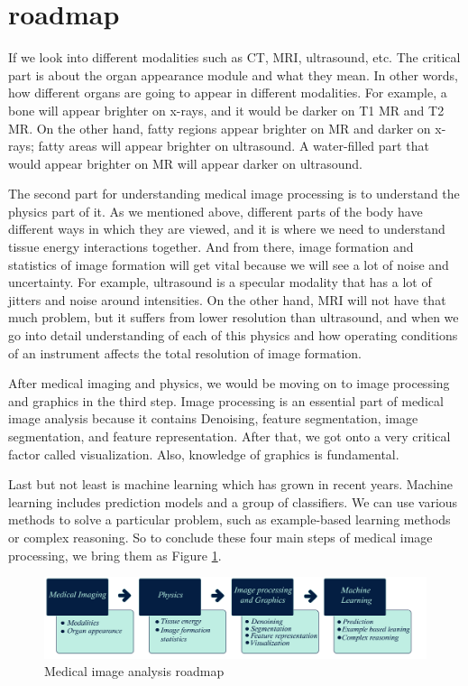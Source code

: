 \section{roadmap}


If we look into different modalities such as CT, MRI, ultrasound, etc. The critical part is about the organ appearance module and what they mean. In other words, how different organs are going to appear in different modalities. For example, a bone will appear brighter on x-rays, and it would be darker on T1 MR and T2 MR. On the other hand, fatty regions appear brighter on MR and darker on x-rays; fatty areas will appear brighter on ultrasound. A water-filled part that would appear brighter on MR will appear darker on ultrasound.

The second part for understanding medical image processing is to understand the physics part of it. As we mentioned above, different parts of the body have different ways in which they are viewed, and it is where we need to understand tissue energy interactions together. And from there, image formation and statistics of image formation will get vital because we will see a lot of noise and uncertainty. For example, ultrasound is a specular modality that has a lot of jitters and noise around intensities.
On the other hand, MRI will not have that much problem, but it suffers from lower resolution than ultrasound, and when we go into detail understanding of each of this physics and how operating conditions of an instrument affects the total resolution of image formation.

After medical imaging and physics, we would be moving on to image processing and graphics in the third step. Image processing is an essential part of medical image analysis because it contains Denoising, feature segmentation, image segmentation, and feature representation. After that, we got onto a very critical factor called visualization. Also, knowledge of graphics is fundamental. 

Last but not least is machine learning which has grown in recent years. Machine learning includes prediction models and a group of classifiers. We can use various methods to solve a particular problem, such as example-based learning methods or complex reasoning. So to conclude these four main steps of medical image processing, we bring them as Figure \ref{fig3}.

\begin{figure}[h]
	\includegraphics[width=1\columnwidth]{./figures/Fig3.png}
	\caption{Medical image analysis roadmap}
	\label{fig3}
\end{figure}

